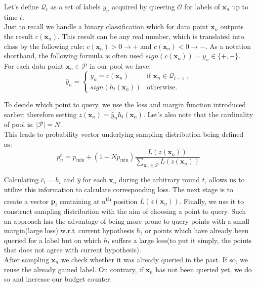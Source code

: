 \documentclass[12pt, a4paper, pdflatex, leqno, twoside]{report}
\newcommand{\ts}{\textsuperscript}
\begin{document}
Let's define $\mathscr{Q}_t$ as a set of labels $y_n$ acquired by queering $\mathscr{O}$ for labels of $\mathbf{x}_n$ up to time $t$.\\
Just to recall we handle a binary classification which for data point 
$\mathbf{x}_n$ outputs the result $c(\mathbf{x}_n)$. This result can be any real 
number, which is translated into class by the following rule: $c(\mathbf{x}_n) > 
0 \rightarrow +$ and $c(\mathbf{x}_n) < 0 \rightarrow -$. As a notation 
shorthand, the following formula is often used $\textit{sign}(c(\mathbf{x}_n)) = y_n \in \{+, -\}$.\\

For each data point $\mathbf{x}_n \in \mathscr{P}$ in our pool we have:
$$
\hat{y}_n = \begin{cases}
                                    y_n = c(\mathbf{x}_n)  & \text{if } 
\mathbf{x}_n \in \mathscr{Q}_{t-1} \text{ ,} \\
                                    \textit{sign}(h_t(\mathbf{x}_n)) & 
\text{otherwise.}
                                  \end{cases} 
$$

To decide which point to query, we use the loss and margin 
function introduced earlier; therefore setting $z(\mathbf{x}_n) = \hat{y}_n h_t(\mathbf{x}_n)$. 
Let's also note that the cardinality of pool is: $|\mathscr{P}| = N$.\\
This leads to probability vector underlying sampling distribution being defined 
as:
$$
p_n^t = p_{\text{min}} + (1-Np_{\text{min}}) 
\frac{L(z(\mathbf{x}_n))}{\sum_{\mathbf{x}_n \in \mathscr{P}} L(z(\mathbf{x}_n))}
$$

Calculating $\hat{c}_t = h_t$ and $\hat{y}$ for each $\mathbf{x}_n$ during the 
arbitrary round $t$, allows us to utilize this information to calculate 
corresponding loss. The next stage is to create a vector $\mathbf{p}_t$ 
containing at n\ts{th} position $L(z(\mathbf{x}_n))$. Finally, we use it to 
construct sampling distribution with the aim of choosing a point to query. Such an approach has 
the advantage of being more prone to query points with a small margin(large loss) 
w.r.t\ current hypothesis $h_t$ or points which have already been queried for a 
label but on which $h_t$ suffers a large loss(to put it simply, the points that does not agree with current hypothesis).\\

After sampling $\mathbf{x}_n$ we check whether it was already queried in the 
past. If so, we reuse the already gained label. On contrary, if $\mathbf{x}_n$ has 
not been queried yet, we do so and increase our budget counter.
\end{document}

